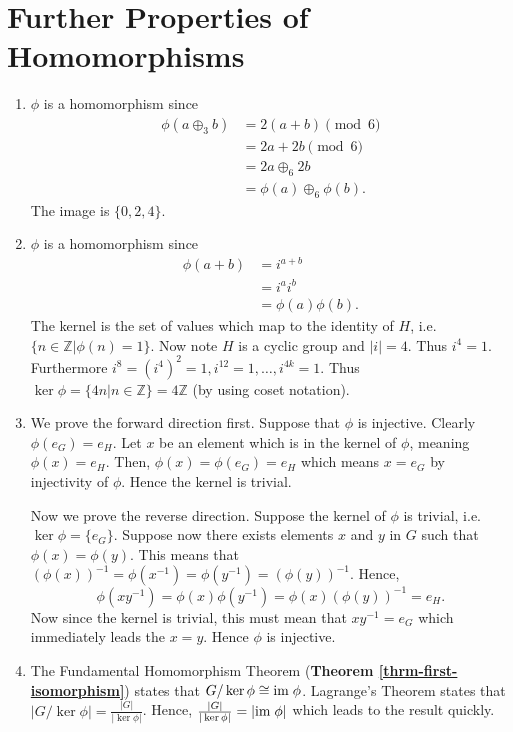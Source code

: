 \section{Further Properties of Homomorphisms}
\begin{enumerate}
    \item $\phi$ is a homomorphism since
    \begin{align*}
        \phi(a \oplus_3 b) &= 2(a+b) \pmod{6}\\
        &= 2a + 2b \pmod{6}\\
        &= 2a \oplus_6 2b\\
        &= \phi(a) \oplus_6 \phi(b).
    \end{align*}
    The image is $\{0, 2, 4\}$.

    \item $\phi$ is a homomorphism since
    \begin{align*}
        \phi(a+b) &= i^{a+b}\\
        &=i^ai^b\\
        &=\phi(a)\phi(b).
    \end{align*}
    The kernel is the set of values which map to the identity of $H$, i.e. $\{n \in \mathbb{Z} \vert \phi(n) = 1\}$. Now note $H$ is a cyclic group and $|i| = 4$. Thus $i^4 = 1$. Furthermore $i^8 = (i^4)^2 = 1, i^{12} = 1, \dots, i^{4k} = 1$. Thus $\ker\phi = \{4n \vert n \in \mathbb{Z}\} = 4\mathbb{Z}$ (by using coset notation).

    \item We prove the forward direction first. Suppose that $\phi$ is injective. Clearly $\phi(e_G) = e_H$. Let $x$ be an element which is in the kernel of $\phi$, meaning $\phi(x) = e_H$. Then, $\phi(x) = \phi(e_G) = e_H$ which means $x = e_G$ by injectivity of $\phi$. Hence the kernel is trivial.

    Now we prove the reverse direction. Suppose the kernel of $\phi$ is trivial, i.e. $\ker \phi = \{e_G\}$. Suppose now there exists elements $x$ and $y$ in $G$ such that $\phi(x) = \phi(y)$. This means that $(\phi(x))^{-1} = \phi(x^{-1}) = \phi(y^{-1}) = (\phi(y))^{-1}$. Hence,
    \[
        \phi(xy^{-1})
        = \phi(x)\phi(y^{-1})
        = \phi(x)\left(\phi(y)\right)^{-1}
        = e_H.
    \]
    Now since the kernel is trivial, this must mean that $xy^{-1} = e_G$ which immediately leads the $x=y$. Hence $\phi$ is injective.

    \item The Fundamental Homomorphism Theorem (\textbf{Theorem \ref{thrm-first-isomorphism}}) states that $G / \ker \phi \cong \mathrm{im}\; \phi$. Lagrange's Theorem states that $|G / \ker \phi| = \frac{|G|}{|\ker\phi|}$. Hence, $\frac{|G|}{|\ker\phi|} = |\mathrm{im}\;\phi|$ which leads to the result quickly.


\end{enumerate}
